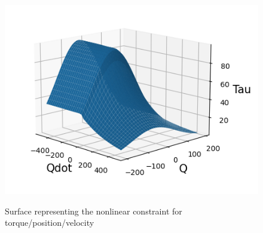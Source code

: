 \begin{figure}[h!]
\includegraphics[width=\columnwidth]{figures/graph_force_vitesse_longueur.png}\\
\caption{Surface representing the nonlinear constraint for torque/position/velocity }
\label{fig:graph_force_vitesse_longueur}
\end{figure}